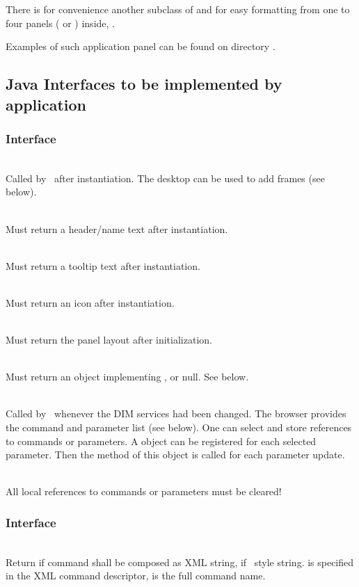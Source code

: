 There is for convenience another subclass of  and  for easy formatting from one to four panels 
( or ) inside,
.

Examples of such application panel can be found on directory .
\subsection{Java Interfaces to be implemented by application}
\subsubsection{Interface }
\bcir
\item {}\\
Called by \gui\ after instantiation. The desktop can be used to add frames (see below).
\item {}\\
Must return a header/name text after instantiation.
\item {}\\
Must return a tooltip text after instantiation.
\item {}\\
Must return an icon after instantiation.
\item {}\\
Must return the panel layout after initialization.
\item {}\\
Must return an object implementing , or null. See below.
\item {}\\
Called by \gui\ whenever the DIM services had been changed.
The browser provides the command and parameter list (see below). 
One can select and store references to commands or parameters. 
A  object can be registered for each selected parameter. 
Then the  method of this object is called for each parameter update.
\item {}\\
All local references to commands or parameters must be cleared!
\ecir
\subsubsection{Interface }
\bcir
\item {}\\
Return  if command shall be composed as XML string, 
 if \mbs\ style string.  
is specified in the XML command descriptor,  is the full command name.
\ecir
